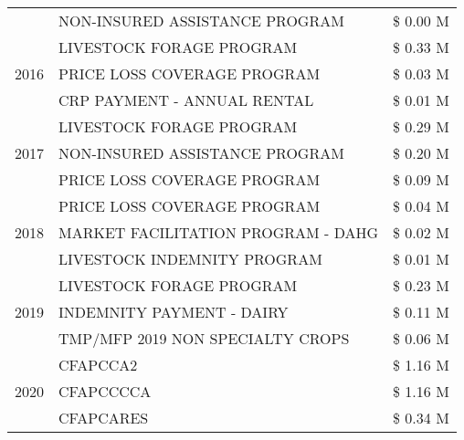 \begin{tabular}{llr}
 & NON-INSURED ASSISTANCE PROGRAM & \$ 0.00 M \\
\cline{1-3}
\multirow[t]{3}{*}{2016} & LIVESTOCK FORAGE PROGRAM                      & \$ 0.33 M \\
 & PRICE LOSS COVERAGE PROGRAM                   & \$ 0.03 M \\
 & CRP PAYMENT - ANNUAL RENTAL                   & \$ 0.01 M \\
\cline{1-3}
\multirow[t]{3}{*}{2017} & LIVESTOCK FORAGE PROGRAM & \$ 0.29 M \\
 & NON-INSURED ASSISTANCE PROGRAM & \$ 0.20 M \\
 & PRICE LOSS COVERAGE PROGRAM & \$ 0.09 M \\
\cline{1-3}
\multirow[t]{3}{*}{2018} & PRICE LOSS COVERAGE PROGRAM & \$ 0.04 M \\
 & MARKET FACILITATION PROGRAM - DAHG & \$ 0.02 M \\
 & LIVESTOCK INDEMNITY PROGRAM & \$ 0.01 M \\
\cline{1-3}
\multirow[t]{3}{*}{2019} & LIVESTOCK FORAGE PROGRAM & \$ 0.23 M \\
 & INDEMNITY PAYMENT - DAIRY & \$ 0.11 M \\
 & TMP/MFP 2019 NON SPECIALTY CROPS & \$ 0.06 M \\
\cline{1-3}
\multirow[t]{3}{*}{2020} & CFAPCCA2 & \$ 1.16 M \\
 & CFAPCCCCA & \$ 1.16 M \\
 & CFAPCARES & \$ 0.34 M \\
\cline{1-3}
\bottomrule
\end{tabular}
